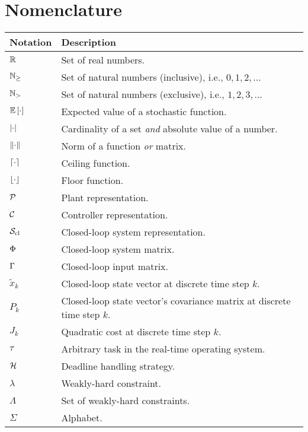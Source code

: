 \chapter*{Nomenclature}%
%
\vspace{-1.75cm}

\begin{table*}[h]
    \centering
    \begin{tabular}{l|l}%
        \textbf{Notation} & \textbf{Description} \\\hline
        $\mathbb{R}$ & Set of real numbers. \\
        $\mathbb{N}_{\geq}$ & Set of natural numbers (inclusive), i.e., $0, 1, 2, \ldots$ \\
        $\mathbb{N}_{>}$ & Set of natural numbers (exclusive), i.e., $1, 2, 3, \ldots$ \\
        $\mathbb{E}\left[ \cdot \right]$ & Expected value of a stochastic function. \\
        $\left|\cdot\right|$ & Cardinality of a set \emph{and} absolute value of a number. \\
        $\lVert\cdot\rVert$ & Norm of a function \emph{or} matrix. \\
        $\lceil\cdot\rceil$ & Ceiling function. \\
        $\lfloor\cdot\rfloor$ & Floor function. \\
        $\mathcal{P}$ & Plant representation. \\
        $\mathcal{C}$ & Controller representation. \\
        $\mathcal{S}_{\text{cl}}$ & Closed-loop system representation. \\
        $\Phi$ & Closed-loop system matrix. \\
        $\Gamma$ & Closed-loop input matrix. \\
        $\tilde{x}_k$ & Closed-loop state vector at discrete time step $k$. \\
        $P_k$ & Closed-loop state vector's covariance matrix at discrete time step $k$. \\
        $J_k$ & Quadratic cost at discrete time step $k$. \\
        $\tau$ & Arbitrary task in the real-time operating system. \\
        $\mathcal{H}$ & Deadline handling strategy. \\
        $\lambda$ & Weakly-hard constraint. \\
        $\Lambda$ & Set of weakly-hard constraints. \\
        $\Sigma$ & Alphabet. \\

\end{tabular}
\end{table*}
